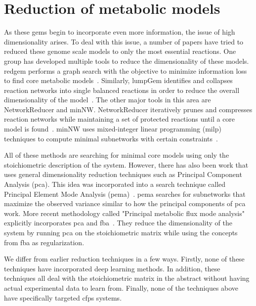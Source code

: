 
\section{Reduction of metabolic models}
As these \glspl{gem} begin to incorporate even more information, the issue of high dimensionality arises.
To deal with this issue, a number of papers have tried to reduced these genome scale models to only the most essential reactions.
One group has developed multiple tools to reduce the dimensionality of these models.
red\gls{gem} performs a graph search with the objective to minimize information loss to find core metabolic models~\cite{ataman2017redgem}.
Similarly, lumpGem identifies and collapses reaction networks into single balanced reactions in order to reduce the overall dimensionality of the model~\cite{ataman2017lumpgem}.
The other major tools in this area are NetworkReducer and minNW.
NetworkReducer iteratively prunes and compresses reaction networks while maintaining a set of protected reactions until a core model is found~\cite{erdrich2015algorithm}.
minNW uses mixed-integer linear programming (\gls{milp}) techniques to compute minimal subnetworks with certain constraints~\cite{rohl2017mixed}.

All of these methods are searching for minimal core models using only the stoichiometric description of the system.
However, there has also been work that uses general dimensionality reduction techniques such as Principal Component Analysis (\gls{pca}).
This idea was incorporated into a search technique called Principal Element Mode Analysis (\gls{pema})~\cite{von2016principal}.
\gls{pema} searches for subnetworks that maximize the observed variance similar to how the principal components of \gls{pca} work.
More recent methodology called "Principal metabolic flux mode analysis" explicitly incorporates \gls{pca} and \gls{fba}~\cite{bhadra2017principal}.
They reduce the dimensionality of the system by running \gls{pca} on the stoichiometric matrix while using the concepts from \gls{fba} as regularization.

We differ from earlier reduction techniques in a few ways.
Firstly, none of these techniques have incorporated deep learning methods.
In addition, these techniques all deal with the stoichiometric matrix in the abstract without having actual experimental data to learn from.
Finally, none of the techniques above have specifically targeted \gls{cfps} systems.

